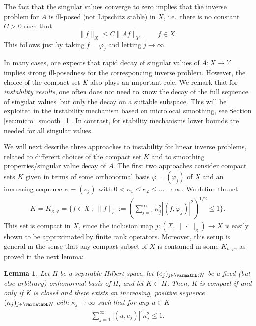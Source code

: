\documentclass[12pt,twoside]{amsart}
\numberwithin{equation}{section}
\renewcommand{\leq}{\leqslant}
\newtheorem{lemma}[theorem]{Lemma}
\newcommand{\norm}[1]{\lVert #1 \rVert}         %
\begin{document}
\begin{appendix}
The fact that the singular values converge to zero implies that the inverse problem for $A$ is ill-posed (not Lipschitz stable) in $X$, i.e.\ there is no constant $C > 0$ such that 
\begin{equation*}
\norm{f}_{X} \leq C \norm{Af}_{Y}, \qquad f \in X.
\end{equation*}
This follows just by taking $f = \varphi_j$ and letting $j \to \infty$.


In many cases, one expects that rapid decay of singular values of $A: X \to Y$ implies strong ill-posedness for the corresponding inverse problem. However, the choice of the compact set $K$ also plays an important role. We remark that for \emph{instability results}, one often does not need to know the decay of the full sequence of singular values, but only the decay on a suitable subspace. This will be exploited in the instability mechanism based on microlocal smoothing, see Section \ref{sec:micro_smooth_1}. In contrast, for stability mechanisms lower bounds are needed for all singular values.
 

We will next describe three approaches to instability for linear inverse problems, related to different choices of the compact set $K$ and to smoothing properties/singular value decay of $A$. The first two approaches consider compact sets $K$ given in terms of some orthonormal basis $\varphi = (\varphi_j)$ of $X$ and an increasing sequence $\kappa = (\kappa_j)$ with $0 < \kappa_1 \leq \kappa_2 \leq \ldots \to \infty$. We define the set 
\begin{align}
\label{eq:ex_K}
K = K_{\kappa, \varphi} = \{ f \in X \ ;\  \norm{f}_{\kappa} := \left( \sum_{j=1}^{\infty} \kappa_j^2 |(f, \varphi_j) |^2 \right)^{1/2} \leq 1 \}.
\end{align}
This set is compact in $X$, since the inclusion map $j: (X, \norm{\,\cdot\,}_{\kappa}) \to X$ is easily shown to be approximated by finite rank operators. Moreover, this setup is general in the sense that any compact subset of $X$ is contained in some $K_{\kappa,\varphi}$, as proved in the next lemma:

\begin{lemma}
\label{lem:compact_sets}
Let $H$ be a separable Hilbert space, let $(e_j)_{j\in \N}$ be a fixed (but else arbitrary) orthonormal basis  of $H$, and let $K \subset H$. Then, $K$ is compact if and only if K is closed and there exists an increasing, positive sequence $(\kappa_j)_{j\in \N}$ with $\kappa_j \rightarrow \infty$ such that for any $u \in K$ 
\begin{align}
\label{eq:finite}
\sum\limits_{j=1}^{\infty}|(u,e_j)|^2 \kappa_j^2 \leq 1.
\end{align} 
\end{lemma}


\end{appendix}
\end{document}
